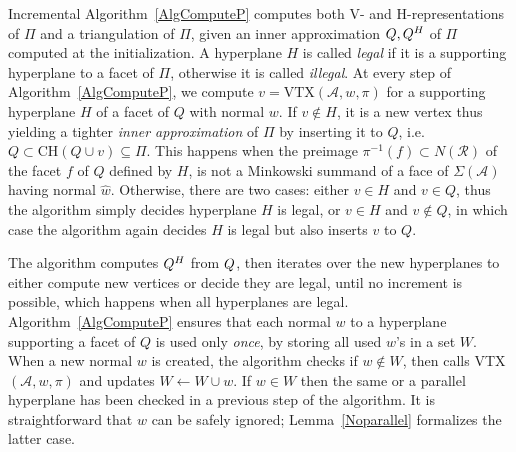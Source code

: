 \documentclass{article}
\def\A{{\mathcal A}} \def\R{{\mathcal R}}
\newcommand{\CH}{\mbox{CH}}
\begin{document}
Incremental Algorithm~\ref{AlgComputeP} computes both V- and
H-representa\-tions of $\varPi$ and a triangulation
of $\varPi$, given an inner approximation $Q,Q^{H}$ of $\varPi$ computed at
the initialization.
A hyperplane $H$ is called \emph{legal}
if it is a supporting hyperplane to a facet of $\varPi$,
otherwise it is called \emph{illegal}.
At every step of Algorithm~\ref{AlgComputeP}, we compute
$v=\mbox{VTX}(\A,w,\pi)$ for a supporting hyperplane $H$ of a facet of
$Q$
with normal $w$.
If $v\notin H$, it is a new vertex thus yielding a tighter \textit{inner
approximation} of $\varPi$ by inserting it to $Q$, i.e.\ $Q\subset
\CH(Q\cup v) \subseteq \varPi$. 
This happens when the preimage  $\pi^{-1}(f)\subset N(\R)$ of the facet $f$ of
$Q$ 
defined by $H$, is not a Minkowski summand of a face of $\Sigma(\A)$ having 
normal $\widehat{w}$.
Otherwise, there are two cases: either $v\in H$ and $v\in Q$, 
thus the algorithm simply decides hyperplane $H$ is legal, or
$v\in H$ and $v \notin Q$, in which case the algorithm again
decides $H$ is legal but also inserts $v$ to $Q$.

The algorithm computes $Q^{H}$ from $Q$, then iterates over the
new hyperplanes to either compute new vertices or decide they are legal,
until no increment is possible, which happens when all hyperplanes
are legal. 
Algorithm~\ref{AlgComputeP} ensures that each normal $w$ to a hyperplane
supporting a facet of $Q$ is used only \emph{once}, by storing all used $w$'s in
a set $W$.
When a new normal $w$ is created, the algorithm checks if $w\notin W$,
then calls VTX$(\A,w,\pi)$ and updates $W\leftarrow W\cup w$.
If $w\in W$ then the same or a parallel hyperplane has been
checked in a previous step of the algorithm.
It is straightforward that $w$ can be safely ignored;
Lemma~\ref{Noparallel} formalizes the latter case.
\end{document}
